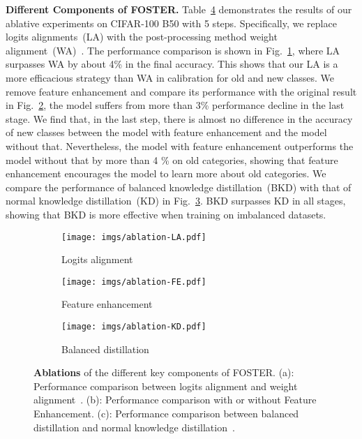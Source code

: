 \documentclass[runningheads]{llncs}
\begin{document}
\noindent\textbf{Different Components  of FOSTER.}
Table~\ref{fig:ablation} demonstrates the results of our ablative experiments on CIFAR-100 B50 with 5 steps.  Specifically, we replace logits alignments~(LA) with the post-processing method weight alignment~(WA)~\cite{WA}. The performance comparison is shown in Fig.~\ref{fig:LA}, where LA surpasses WA by about 4\% in the final accuracy. This shows that our LA is a more efficacious strategy than WA in calibration for old and new classes. We remove feature enhancement and compare its performance with the original result in Fig.~\ref{fig:FE}, the model suffers from more than 3\% performance decline in the last stage. We find that, in the last step, there is almost no difference in the accuracy of new classes between the model with feature enhancement and the model without that. Nevertheless, the model with feature enhancement outperforms the model without that by more than 4 \% on old categories, showing that feature enhancement encourages the model to learn more about old categories. We compare the performance of balanced knowledge distillation~(BKD) with that of normal knowledge distillation~(KD) in Fig.~\ref{fig:BKD}. BKD surpasses KD in all stages, showing that BKD is more effective when training on imbalanced datasets.
\begin{figure}[t]
    \centering
  \begin{subfigure}[b]{0.32\linewidth}
    \texttt{[image: imgs/ablation-LA.pdf]}
    \caption{\small Logits alignment}
    \label{fig:LA}
  \end{subfigure}
  \hfill
  \begin{subfigure}[b]{0.32\linewidth}
    \texttt{[image: imgs/ablation-FE.pdf]}
    \caption{\small Feature enhancement}
    \label{fig:FE}
  \end{subfigure}
   \hfill
  \begin{subfigure}[b]{0.32\linewidth}
    \texttt{[image: imgs/ablation-KD.pdf]}
    \caption{\small Balanced distillation}
    \label{fig:BKD}
  \end{subfigure}
    \caption{\small \textbf{Ablations} of the different key components of FOSTER. (a): Performance comparison between logits alignment and weight alignment~\cite{WA}. (b): Performance comparison with or without Feature Enhancement. (c): Performance comparison between balanced distillation and normal knowledge distillation~\cite{KD}.} 
    \label{fig:ablation}
\end{figure}
\end{document}
